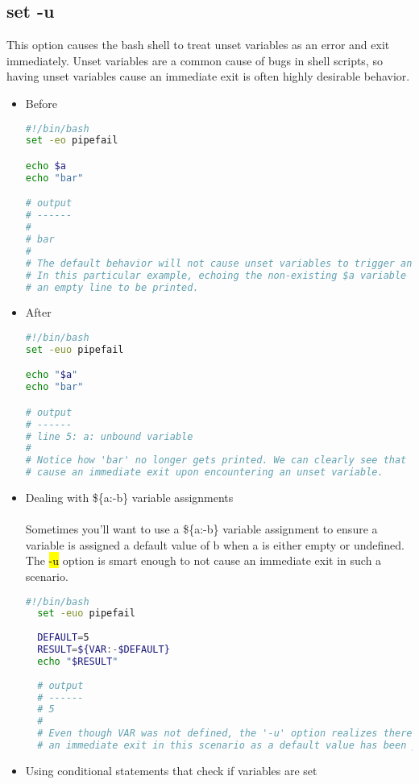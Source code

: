 \documentclass[a4paper]{article}
\begin{document}
\subsection{set -u}
 This option causes the bash shell to treat unset variables as an error and exit immediately. 
Unset variables are a common cause of bugs in shell scripts, so having unset variables cause an immediate exit is often highly desirable behavior.
\begin{itemize}
 \item Before
  \begin{lstlisting}[language=Bash]
#!/bin/bash
set -eo pipefail

echo $a
echo "bar"

# output
# ------
#
# bar
#
# The default behavior will not cause unset variables to trigger an immediate exit.
# In this particular example, echoing the non-existing $a variable will just cause
# an empty line to be printed.
  \end{lstlisting} 
 \item After
  \begin{lstlisting}[language=Bash]
#!/bin/bash
set -euo pipefail

echo "$a"
echo "bar"

# output
# ------
# line 5: a: unbound variable
#
# Notice how 'bar' no longer gets printed. We can clearly see that '-u' did indeed
# cause an immediate exit upon encountering an unset variable.
  \end{lstlisting}
\item Dealing with \$\{a:-b\} variable assignments
\paragraph{}
Sometimes you’ll want to use a \$\{a:-b\} variable assignment to ensure a variable is assigned a default value of b when a is either empty or undefined. 
The \hl{-u} option is smart enough to not cause an immediate exit in such a scenario.

\begin{lstlisting}[language=Bash]
  #!/bin/bash
  set -euo pipefail
  
  DEFAULT=5
  RESULT=${VAR:-$DEFAULT}
  echo "$RESULT"
  
  # output
  # ------
  # 5
  #
  # Even though VAR was not defined, the '-u' option realizes there's no need to cause
  # an immediate exit in this scenario as a default value has been provided.
  \end{lstlisting}
  \item Using conditional statements that check if variables are set

\end{itemize}
\end{document}
